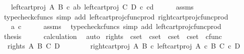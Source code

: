 \begin{isabellebody}
\ {\isachardoublequoteopen}{\isachardot}{\kern0pt}{\isachardot}{\kern0pt}{\isachardot}{\kern0pt}\ {\isacharequal}{\kern0pt}\ {\isasymlangle}left{\isacharunderscore}{\kern0pt}cart{\isacharunderscore}{\kern0pt}proj\ A\ B\ {\isasymcirc}\isactrlsub c\ {\isasymlangle}a{\isacharcomma}{\kern0pt}b{\isasymrangle}{\isacharcomma}{\kern0pt}\ left{\isacharunderscore}{\kern0pt}cart{\isacharunderscore}{\kern0pt}proj\ C\ D\ {\isasymcirc}\isactrlsub c\ {\isasymlangle}c{\isacharcomma}{\kern0pt}d{\isasymrangle}{\isasymrangle}{\isachardoublequoteclose}\isanewline
\ \ \ \ \isamarkupfalse%
\ assms\ \isamarkupfalse%
\ {\isacharparenleft}{\kern0pt}typecheck{\isacharunderscore}{\kern0pt}cfuncs{\isacharcomma}{\kern0pt}\ simp\ add{\isacharcolon}{\kern0pt}\ left{\isacharunderscore}{\kern0pt}cart{\isacharunderscore}{\kern0pt}proj{\isacharunderscore}{\kern0pt}cfunc{\isacharunderscore}{\kern0pt}prod\ right{\isacharunderscore}{\kern0pt}cart{\isacharunderscore}{\kern0pt}proj{\isacharunderscore}{\kern0pt}cfunc{\isacharunderscore}{\kern0pt}prod{\isacharparenright}{\kern0pt}\isanewline
\ \ \isamarkupfalse%
\ \isamarkupfalse%
\ {\isachardoublequoteopen}{\isachardot}{\kern0pt}{\isachardot}{\kern0pt}{\isachardot}{\kern0pt}\ {\isacharequal}{\kern0pt}\ {\isasymlangle}a{\isacharcomma}{\kern0pt}\ c{\isasymrangle}{\isachardoublequoteclose}\isanewline
\ \ \ \ \isamarkupfalse%
\ assms\ \isamarkupfalse%
\ {\isacharparenleft}{\kern0pt}typecheck{\isacharunderscore}{\kern0pt}cfuncs{\isacharcomma}{\kern0pt}\ simp\ add{\isacharcolon}{\kern0pt}\ left{\isacharunderscore}{\kern0pt}cart{\isacharunderscore}{\kern0pt}proj{\isacharunderscore}{\kern0pt}cfunc{\isacharunderscore}{\kern0pt}prod{\isacharparenright}{\kern0pt}\isanewline
\ \ \isamarkupfalse%
\ \isamarkupfalse%
\ {\isacharquery}{\kern0pt}thesis\isanewline
\ \ \ \ \isamarkupfalse%
\ calculation\ \isamarkupfalse%
\ auto\isanewline
{}\isamarkupfalse%
%
\endisatagproof
{\isafoldproof}%
%
\isadelimproof
\isanewline
%
\endisadelimproof
\isanewline
{}\isamarkupfalse%
\ rights\ {\isacharcolon}{\kern0pt}{\isacharcolon}{\kern0pt}\ {\isachardoublequoteopen}cset\ {\isasymRightarrow}\ cset\ {\isasymRightarrow}\ cset\ {\isasymRightarrow}\ cset\ {\isasymRightarrow}\ cfunc{\isachardoublequoteclose}\ \isanewline
\ \ {\isachardoublequoteopen}rights\ A\ B\ C\ D\ {\isacharequal}{\kern0pt}\ {\isasymlangle}\isanewline
\ \ \ \ \ \ right{\isacharunderscore}{\kern0pt}cart{\isacharunderscore}{\kern0pt}proj\ A\ B\ {\isasymcirc}\isactrlsub c\ left{\isacharunderscore}{\kern0pt}cart{\isacharunderscore}{\kern0pt}proj\ {\isacharparenleft}{\kern0pt}A\ {\isasymtimes}\isactrlsub c\ B{\isacharparenright}{\kern0pt}\ {\isacharparenleft}{\kern0pt}C\ {\isasymtimes}\isactrlsub c\ D{\isacharparenright}{\kern0pt}{\isacharcomma}{\kern0pt}\isanewline

\end{isabellebody}
